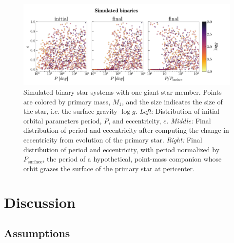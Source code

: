 \documentclass[modern, letterpaper]{aastex62}
\newcommand{\Psurf}{\ensuremath{P_\textrm{surface}}}
\begin{document}
\begin{figure}[htbp]
\begin{center}
\includegraphics[trim={0 0 1cm 0}, clip, width=\linewidth]{simulated}
\end{center}
\caption{%
Simulated binary star systems with one giant star member.
Points are colored by primary mass, $M_1$, and the size indicates the size of
the star, i.e. the surface gravity $\log g$.
\textit{Left:} Distribution of initial orbital parameters period, $P$, and
eccentricity, $e$.
\textit{Middle:} Final distribution of period and eccentricity after computing
the change in eccentricity from evolution of the primary star.
\textit{Right:} Final distribution of period and eccentricity, with period
normalized by \Psurf, the period of a hypothetical, point-mass
companion whose orbit grazes the surface of the primary star at pericenter.
\label{fig:simulated}
}
\end{figure}


\section{Discussion} \label{sec:discussion}

\subsection{Assumptions}
\end{document}
